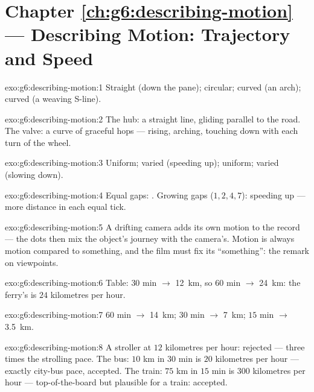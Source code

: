\section*{Chapter \ref{ch:g6:describing-motion} --- Describing Motion: Trajectory and Speed}

\begin{solution}{exo:g6:describing-motion:1}
Straight (down the pane); circular; curved (an arch); curved (a
weaving S-line).
\end{solution}

\begin{solution}{exo:g6:describing-motion:2}
The hub: a straight line, gliding parallel to the road. The valve:
a curve of graceful hops --- rising, arching, touching down with
each turn of the wheel.
\end{solution}

\begin{solution}{exo:g6:describing-motion:3}
Uniform; varied (speeding up); uniform; varied (slowing down).
\end{solution}

\begin{solution}{exo:g6:describing-motion:4}
Equal gaps: . Growing gaps ($1, 2, 4, 7$): speeding
up --- more distance in each equal tick.
\end{solution}

\begin{solution}{exo:g6:describing-motion:5}
A drifting camera adds its own motion to the record --- the dots
then mix the object's journey with the camera's. Motion is always
motion compared to something, and the film must fix its
``something'': the remark on viewpoints.
\end{solution}

\begin{solution}{exo:g6:describing-motion:6}
Table: $30$ min $\to$ \qty{12}{km}, so $60$ min $\to$
\qty{24}{km}: the ferry's  is $24$ kilometres per hour.
\end{solution}

\begin{solution}{exo:g6:describing-motion:7}
$60$ min $\to$ \qty{14}{km}; $30$ min $\to$ \qty{7}{km}; $15$ min
$\to$ \qty{3.5}{km}.
\end{solution}

\begin{solution}{exo:g6:describing-motion:8}
A stroller at $12$ kilometres per hour: rejected --- three times
the strolling pace. The bus: $10$ km in $30$ min is $20$
kilometres per hour --- exactly city-bus pace, accepted. The
train: $75$ km in $15$ min is $300$ kilometres per hour ---
top-of-the-board but plausible for a  train: accepted.
\end{solution}

